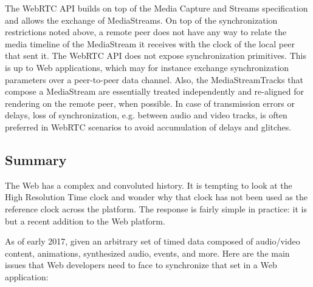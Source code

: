 The WebRTC API builds on top of the Media Capture and Streams specification
and allows the exchange of MediaStreams. On top of the synchronization
restrictions noted above, a remote peer does not have any way to relate the
media timeline of the MediaStream it receives with the clock of the local
peer that sent it. The WebRTC API does not expose synchronization primitives.
This is up to Web applications, which may for instance exchange
synchronization parameters over a peer-to-peer data channel. Also, the
MediaStreamTracks that compose a MediaStream are essentially treated
independently and re-aligned for rendering on the remote peer, when possible.
In case of transmission errors or delays, loss of synchronization, e.g.
between audio and video tracks, is often preferred in WebRTC scenarios to
avoid accumulation of delays and glitches.

\subsection{Summary}

The Web has a complex and convoluted history. It is tempting to look at the
High Resolution Time clock and wonder why that clock has not been used as the
reference clock across the platform. The response is fairly simple in
practice: it is but a recent addition to the Web platform.

As of early 2017, given an arbitrary set of timed data composed of
audio/video content, animations, synthesized audio, events, and more. Here are
the main issues that Web developers need to face to synchronize that set in a
Web application:


